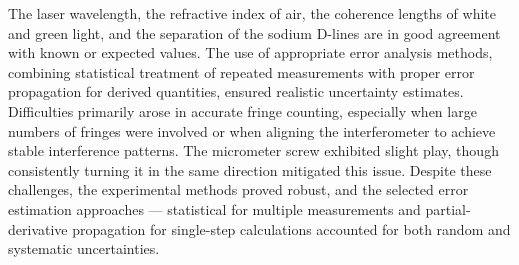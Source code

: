  
The laser wavelength, the refractive index of air, the coherence lengths of white and green light, and the separation of the sodium D-lines are in good agreement with known or expected values. The use of appropriate error analysis methods, combining statistical treatment of repeated measurements with proper error propagation for derived quantities, ensured realistic uncertainty estimates. 
Difficulties primarily arose in accurate fringe counting, especially when large numbers of fringes were involved or when aligning the interferometer to achieve stable interference patterns. The micrometer screw exhibited slight play, though consistently turning it in the same direction mitigated this issue. Despite these challenges, the experimental methods proved robust, and the selected error estimation approaches — statistical for multiple measurements and partial-derivative propagation for single-step calculations accounted for both random and systematic uncertainties.
